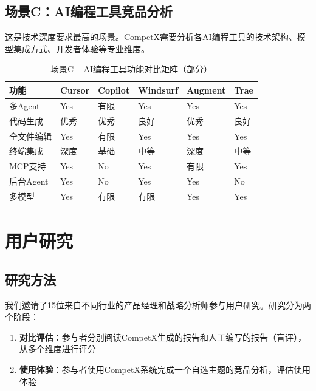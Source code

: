 \documentclass[12pt,a4paper]{ctexrep}
\begin{document}
\subsection{场景C：AI编程工具竞品分析}

这是技术深度要求最高的场景。CompetX需要分析各AI编程工具的技术架构、模型集成方式、开发者体验等专业维度。

\begin{table}[H]
\centering
\caption{场景C -- AI编程工具功能对比矩阵（部分）}
\label{tab:coding-tools}
{\small
\begin{tabular}{p{2.5cm} >{\centering\arraybackslash}p{2cm} >{\centering\arraybackslash}p{2cm} >{\centering\arraybackslash}p{2cm} >{\centering\arraybackslash}p{2cm} >{\centering\arraybackslash}p{2cm}}
\toprule
\textbf{功能} & \textbf{Cursor} & \textbf{Copilot} & \textbf{Windsurf} & \textbf{Augment} & \textbf{Trae} \\
\midrule
多Agent & Yes & 有限 & Yes & Yes & Yes \\
代码生成 & 优秀 & 优秀 & 良好 & 优秀 & 良好 \\
全文件编辑 & Yes & 有限 & Yes & Yes & Yes \\
终端集成 & 深度 & 基础 & 中等 & 深度 & 中等 \\
MCP支持 & Yes & No & Yes & 有限 & Yes \\
后台Agent & Yes & No & Yes & Yes & No \\
多模型 & Yes & 有限 & 有限 & Yes & Yes \\
\bottomrule
\end{tabular}
}
\end{table}

\section{用户研究}

\subsection{研究方法}

我们邀请了15位来自不同行业的产品经理和战略分析师参与用户研究。研究分为两个阶段：

\begin{enumerate}[leftmargin=2em]
\item \textbf{对比评估}：参与者分别阅读CompetX生成的报告和人工编写的报告（盲评），从多个维度进行评分
\item \textbf{使用体验}：参与者使用CompetX系统完成一个自选主题的竞品分析，评估使用体验
\end{enumerate}
\end{document}
